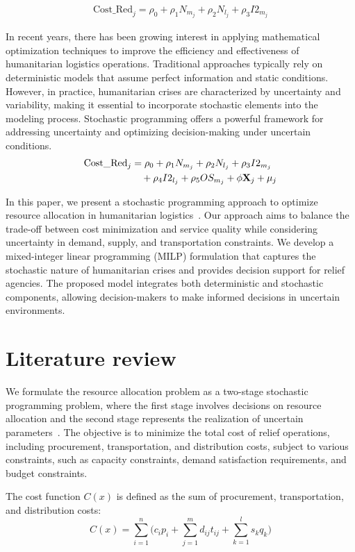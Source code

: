 \documentclass[deca,sglanonrev]{informs4}
\begin{document}
\begin{align}
\mathrm{Cost\_Red}_j=\rho_0+\rho_1N_{m_j}+\rho_2N_{l_j}+\rho_3I2_{m_j}
\end{align}

In recent years, there has been growing interest in applying mathematical optimization techniques to improve the efficiency and effectiveness of humanitarian logistics operations. Traditional approaches typically rely on deterministic models that assume perfect information and static conditions. However, in practice, humanitarian crises are characterized by uncertainty and variability, making it essential to incorporate stochastic elements into the modeling process. Stochastic programming offers a powerful framework for addressing uncertainty and optimizing decision-making under uncertain conditions.
\begin{align}
\mbox{Cost\_Red}_j&=\rho_0+\rho_1N_{m_j}+\rho_2N_{l_j}+\rho_3I2_{m_j}\notag\\
&\quad+\rho_4I2_{l_j}+\rho_5OS_{m_j}+\phi\mathbf{X}_j+\mu_j
\end{align}

In this paper, we present a stochastic programming approach to optimize resource allocation in humanitarian logistics~\citep{jones2010}. Our approach aims to balance the trade-off between cost minimization and service quality while considering uncertainty in demand, supply, and transportation constraints. We develop a mixed-integer linear programming (MILP) formulation that captures the stochastic nature of humanitarian crises and provides decision support for relief agencies. The proposed model integrates both deterministic and stochastic components, allowing decision-makers to make informed decisions in uncertain environments.

\section{Literature review}\label{sec:Review}
We formulate the resource allocation problem as a two-stage stochastic programming problem, where the first stage involves decisions on resource allocation and the second stage represents the realization of uncertain parameters~\citep{smith2005,jones2010,brown2015}. The objective is to minimize the total cost of relief operations, including procurement, transportation, and distribution costs, subject to various constraints, such as capacity constraints, demand satisfaction requirements, and budget constraints.

The cost function $C(x)$ is defined as the sum of procurement, transportation, and distribution costs:
\begin{equation}
C(x) = \sum_{i=1}^{n} \Biggl(c_i p_i + \sum_{j=1}^{m} d_{ij} t_{ij} + \sum_{k=1}^{l} s_k q_k\Biggr)
\end{equation}
\end{document}
